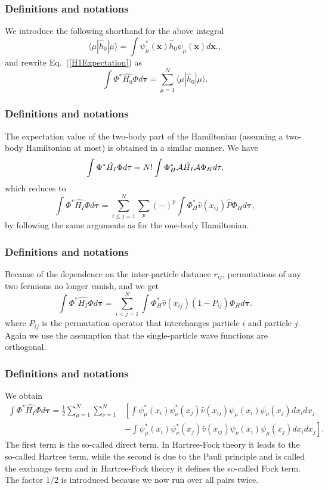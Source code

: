 \frame
{
  \frametitle{Definitions and notations}
\begin{small}
{\scriptsize
We introduce the following shorthand for the above integral
\[
\langle \mu | \hat{h}_0 | \mu \rangle = \int \psi_{\mu}^*(\mathbf{x})\hat{h}_0\psi_{\mu}(\mathbf{x})d\mathbf{x}.,
\]
and rewrite Eq.~(\ref{H1Expectation}) as
\begin{equation}
  \int \Phi^*\hat{H_0}\Phi  d\mathbf{\tau}
  = \sum_{\mu=1}^N \langle \mu | \hat{h}_0 | \mu \rangle.
  \label{H1Expectation1}
\end{equation}

}
\end{small}
}
\frame
{
  \frametitle{Definitions and notations}
\begin{small}
{\scriptsize
The expectation value of the two-body part of the Hamiltonian (assuming a two-body Hamiltonian at most) is obtained in a
similar manner. We have
\begin{equation*}
  \int \Phi^*\hat{H_I}\Phi d\mathbf{\tau} 
  = N! \int \Phi_H^*{\cal A}\hat{H_I}{\cal A}\Phi_H d\mathbf{\tau},
\end{equation*}
which reduces to
\begin{equation*}
 \int \Phi^*\hat{H_I}\Phi d\mathbf{\tau} 
  = \sum_{i\le j=1}^N \sum_{p} (-)^p\int 
  \Phi_H^*\hat{v}(x_{ij})\hat{P}\Phi_H d\mathbf{\tau},
\end{equation*}
by following the same arguments as for the one-body
Hamiltonian. 
}
\end{small}
}
\frame
{
  \frametitle{Definitions and notations}
\begin{small}
{\scriptsize
Because of the dependence on the inter-particle distance $r_{ij}$,  permutations of
any two fermions no longer vanish, and we get
\begin{equation*}
  \int \Phi^*\hat{H_I}\Phi d\mathbf{\tau} 
  = \sum_{i < j=1}^N \int  
  \Phi_H^*\hat{v}(x_{ij})(1-P_{ij})\Phi_H d\mathbf{\tau}.
\end{equation*}
where $P_{ij}$ is the permutation operator that interchanges
particle $i$ and particle $j$. Again we use the assumption that the single-particle wave functions
are orthogonal. 
}
\end{small}
}
\frame
{
  \frametitle{Definitions and notations}
\begin{small}
{\scriptsize
We obtain
\begin{equation}
\begin{split}
  \int \Phi^*\hat{H_I}\Phi d\mathbf{\tau} 
  = \frac{1}{2}\sum_{\mu=1}^N\sum_{\nu=1}^N
    &\left[ \int \psi_{\mu}^*(x_i)\psi_{\nu}^*(x_j)\hat{v}(x_{ij})\psi_{\mu}(x_i)\psi_{\nu}(x_j)
    dx_idx_j \right.\\
  &\left.
  - \int \psi_{\mu}^*(x_i)\psi_{\nu}^*(x_j)
  \hat{v}(x_{ij})\psi_{\nu}(x_i)\psi_{\mu}(x_j)
  dx_idx_j
  \right]. \label{H2Expectation}
\end{split}
\end{equation}
The first term is the so-called direct term. In Hartree-Fock theory it leads to the so-called Hartree term, 
while the second is due to the Pauli principle and is called
the exchange term and in Hartree-Fock theory it defines the so-called Fock term.
The factor  $1/2$ is introduced because we now run over
all pairs twice. 
}
\end{small}
}
